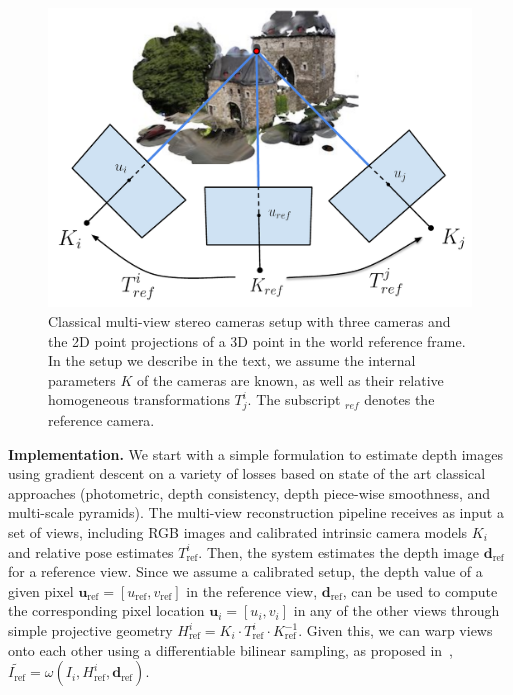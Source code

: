 \begin{figure}[H]
    \begin{center}
        \includegraphics[width=0.75\linewidth]{main/chapter03/data/depth/multiview_setup.pdf} 
    \end{center}
    \caption{Classical multi-view stereo cameras setup with three cameras and the 2D point projections of a  3D point in the world reference frame. In the setup we describe in the text, we assume the internal parameters $K$ of the cameras are known, as well as their relative homogeneous transformations $T^{i}_{j}$. The subscript $_{ref}$ denotes the reference camera. } 
    \label{fig:depth:mvs-scheme}
\end{figure}

\textbf{Implementation.} We start with a simple formulation to estimate depth images using gradient descent on a variety of losses based on state of the art classical approaches (photometric, depth consistency, depth piece-wise smoothness, and multi-scale pyramids). The multi-view reconstruction pipeline receives as input a set of views, including RGB images and calibrated intrinsic camera models $K_{i}$ and relative pose estimates $T_{\text{ref}}^{i}$.  Then, the system   estimates the depth image $\boldsymbol{d}_{\text{ref}}$ for a reference view. Since we assume a calibrated setup, the depth value of a given pixel $\boldsymbol{u}_{\text{ref}} = [u_{\text{ref}},v_{\text{ref}}]$ in the reference view, $\boldsymbol{d}_{\text{ref}}$, can be used to compute the corresponding pixel location $\boldsymbol{u}_i = [u_{i},v_{i}]$ in any of the other views through simple projective geometry $H_{\text{ref}}^{i} = K_i \cdot T_{\text{ref}}^{i} \cdot K_{\text{ref}}^{-1}$. Given this, we can warp views onto each other %
using a differentiable bilinear sampling, as proposed in~\citep{stn_NIPS2015}, $\tilde{I_{\text{ref}}} = \omega(I_i, H_{\text{ref}}^{i}, \boldsymbol{d}_{\text{ref}})$.

